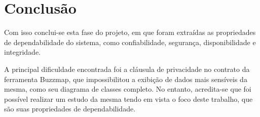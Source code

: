 \section{Conclusão}
Com isso conclui-se esta fase do projeto, em que foram extraídas as
propriedades de dependabilidade do sistema, como confiabilidade,
segurança, disponibilidade e integridade.

A principal dificuldade encontrada foi a cláusula de privacidade no
contrato da ferramenta Buzzmap, que impossibilitou a exibição de dados
mais sensíveis da mesma, como seu diagrama de classes completo. No
entanto, acredita-se que foi possível realizar um estudo da mesma
tendo em vista o foco deste trabalho, que são suas propriedades de
dependabilidade.
